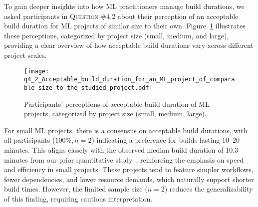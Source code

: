 To gain deeper insights into how ML practitioners manage build durations, we asked participants in \textsc{Question \#4.2} about their perception of an acceptable build duration for ML projects of similar size to their own. Figure~\ref{fig:q4_2_Acceptable_build_duration_for_an_ML_project_of_comparable_size_to_the_studied_project} illustrates these perceptions, categorized by project size (small, medium, and large), providing a clear overview of how acceptable build durations vary across different project scales.

\begin{figure}
	\centering
	\texttt{[image: q4\_2\_Acceptable\_build\_duration\_for\_an\_ML\_project\_of\_comparable\_size\_to\_the\_studied\_project.pdf]}
	\caption{Participants' perceptions of acceptable build duration of ML projects, categorized by project size (small, medium, large).}	\label{fig:q4_2_Acceptable_build_duration_for_an_ML_project_of_comparable_size_to_the_studied_project}       %
\end{figure}



For small ML projects, there is a consensus on acceptable build durations, with all participants ($100\%, n = 2$) indicating a preference for builds lasting 10–20 minutes. This aligns closely with the observed median build duration of 10.3 minutes from our prior quantitative study~\citep{bernardo2024machine}, reinforcing the emphasis on speed and efficiency in small projects. These projects tend to feature simpler workflows, fewer dependencies, and lower resource demands, which naturally support shorter build times. However, the limited sample size ($n = 2$) reduces the generalizability of this finding, requiring cautious interpretation.

